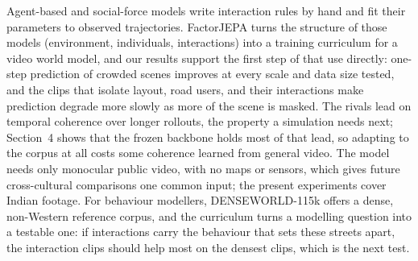 \documentclass[letterpaper]{article} %
\begin{document}
Agent-based and social-force models write interaction rules by hand and fit their parameters to observed trajectories. FactorJEPA turns the structure of those models (environment, individuals, interactions) into a training curriculum for a video world model, and our results support the first step of that use directly: one-step prediction of crowded scenes improves at every scale and data size tested, and the clips that isolate layout, road users, and their interactions make prediction degrade more slowly as more of the scene is masked. The rivals lead on temporal coherence over longer rollouts, the property a simulation needs next; Section~4 shows that the frozen backbone holds most of that lead, so adapting to the corpus at all costs some coherence learned from general video. The model needs only monocular public video, with no maps or sensors, which gives future cross-cultural comparisons one common input; the present experiments cover Indian footage. For behaviour modellers, DENSEWORLD-115k offers a dense, non-Western reference corpus, and the curriculum turns a modelling question into a testable one: if interactions carry the behaviour that sets these streets apart, the interaction clips should help most on the densest clips, which is the next test.



\clearpage  %
{\small

}
\end{document}
